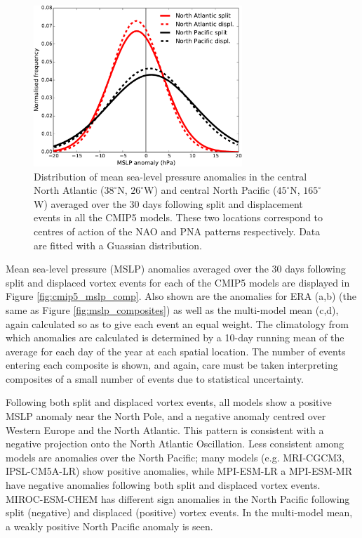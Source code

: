 \begin{figure}
 \centering
 \noindent\includegraphics[width=0.7\textwidth]{figures/chapter-models/NAO_PNA_histogram.pdf}
 \caption[Distribution of MSLP anomalies in North Pacific and Atlantic following
 splits and displacements.]{Distribution of mean sea-level pressure anomalies in
   the central North Atlantic ($38^{\circ}$N, $26^{\circ}$W) and central North
   Pacific ($45^{\circ}$N, $165^{\circ}$W) averaged over the 30 days following
   split and displacement events in all the CMIP5 models. These two locations
   correspond to centres of action of the NAO and PNA patterns
   respectively. Data are fitted with a Guassian distribution.}
 \label{fig:cmip5_nao_pna}
\end{figure}

Mean sea-level pressure (MSLP) anomalies averaged over the 30 days following
split and displaced vortex events for each of the CMIP5 models are displayed in
Figure \ref{fig:cmip5_mslp_comp}. Also shown are the anomalies for ERA (a,b)
(the same as Figure \ref{fig:mslp_composites}) as well as the multi-model mean
(c,d), again calculated so as to give each event an equal weight. The
climatology from which anomalies are calculated is determined by a 10-day
running mean of the average for each day of the year at each spatial
location. The number of events entering each composite is shown, and again, care
must be taken interpreting composites of a small number of events due to
statistical uncertainty.

Following both split and displaced vortex events, all models show a positive
MSLP anomaly near the North Pole, and a negative anomaly centred over Western
Europe and the North Atlantic. This pattern is consistent with a negative
projection onto the North Atlantic Oscillation. Less consistent among models are
anomalies over the North Pacific; many models (e.g. MRI-CGCM3, IPSL-CM5A-LR)
show positive anomalies, while MPI-ESM-LR a MPI-ESM-MR have negative anomalies
following both split and displaced vortex events. MIROC-ESM-CHEM has different
sign anomalies in the North Pacific following split (negative) and displaced
(positive) vortex events. In the multi-model mean, a weakly positive North
Pacific anomaly is seen.

